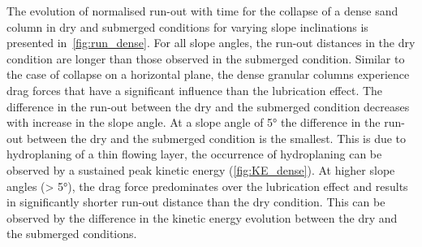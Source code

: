 The evolution of normalised run-out with time for the collapse of a dense sand 
column in dry and submerged conditions for varying slope inclinations is 
presented in~\cref{fig:run_dense}. For all slope angles, the run-out distances 
in the dry 
condition are longer than those observed in the submerged condition. Similar to 
the case of collapse on a horizontal plane, the dense granular columns 
experience drag forces that have a significant influence than the lubrication 
effect. The difference in the run-out between the dry and the submerged 
condition decreases with increase in the slope angle. At a slope angle of 
5\si{\degree} 
the 
difference in the run-out between 
the dry and the submerged condition is the smallest. This is due to 
hydroplaning of a thin flowing layer, the occurrence of hydroplaning can be 
observed by a sustained peak kinetic energy (\cref{fig:KE_dense}). At 
higher slope angles (> 5\si{\degree}), the drag force predominates over the 
lubrication effect and results in significantly shorter run-out distance than 
the dry condition. This can be observed by the difference in the kinetic energy 
evolution between the dry and the submerged conditions.


